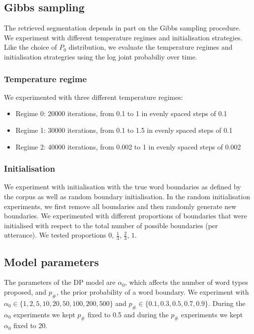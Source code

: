 \subsection{Gibbs sampling}

The retrieved segmentation depends in part on the Gibbs sampling procedure. We experiment with different temperature regimes and initialisation strategies. Like the choice of $P_0$ distribution, we evaluate the temperature regimes and initialisation strategries using the log joint probabiliy over time.

\subsubsection{Temperature regime}

We experimented with three different temperature regimes:

\begin{itemize}
\item Regime 0: 20000 iterations, from 0.1 to 1 in evenly spaced steps of 0.1
\item Regime 1: 30000 iterations, from 0.1 to 1.5 in evenly spaced steps of 0.1
\item Regime 2: 40000 iterations, from 0.002 to 1 in evenly spaced steps of 0.002
\end{itemize}

\subsubsection{Initialisation}

We experiment with initialisation with the true word boundaries as defined by the corpus as well as random boundary initialisation. In the random initialisation experiments, we first remove all boundaries and then randomly generate new boundaries. We experimented with different proportions of boundaries that were initialised with respect to the total number of possible boundaries (per utterance). We tested proportions $0$, $\frac{1}{3}$, $\frac{2}{3}$, $1$.

\subsection{Model parameters}

The parameters of the DP model are $\alpha_0$, which affects the number of word types proposed, and $p_\#$, the prior probability of a word boundary. We experiment with $\alpha_0 \in \{1, 2, 5, 10, 20, 50, 100, 200, 500\}$ and $p_\# \in \{0.1, 0.3, 0.5, 0.7, 0.9\}$. During the $\alpha_0$ experiments we kept $p_\#$ fixed to 0.5 and during the $p_\#$ experiments we kept $\alpha_0$ fixed to 20.


